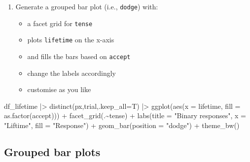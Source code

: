 \documentclass[
  letterpaper,
  DIV=11,
  numbers=noendperiod]{scrartcl}
\newenvironment{Shaded}{\begin{snugshade}}{\end{snugshade}}
\newcommand{\AttributeTok}[1]{\textcolor[rgb]{0.40,0.45,0.13}{#1}}
\newcommand{\FunctionTok}[1]{\textcolor[rgb]{0.28,0.35,0.67}{#1}}
\newcommand{\NormalTok}[1]{\textcolor[rgb]{0.00,0.23,0.31}{#1}}
\newcommand{\SpecialCharTok}[1]{\textcolor[rgb]{0.37,0.37,0.37}{#1}}
\newcommand{\StringTok}[1]{\textcolor[rgb]{0.13,0.47,0.30}{#1}}
\providecommand{\tightlist}{%
  \setlength{\itemsep}{0pt}\setlength{\parskip}{0pt}}\usepackage{longtable,booktabs,array}
\begin{document}
\begin{enumerate}
\def\labelenumi{\arabic{enumi}.}
\tightlist
\item
  Generate a grouped bar plot (i.e., \texttt{dodge}) with:

  \begin{itemize}
  \tightlist
  \item
    a facet grid for \texttt{tense}
  \item
    plots \texttt{lifetime} on the x-axis
  \item
    and fills the bars based on \texttt{accept}
  \item
    change the labels accordingly
  \item
    customise as you like
  \end{itemize}
\end{enumerate}

\begin{Shaded}
\begin{Highlighting}[]
\NormalTok{df\_lifetime }\SpecialCharTok{|\textgreater{}} 
  \FunctionTok{distinct}\NormalTok{(px,trial,}\AttributeTok{.keep\_all=}\NormalTok{T) }\SpecialCharTok{|\textgreater{}} 
  \FunctionTok{ggplot}\NormalTok{(}\FunctionTok{aes}\NormalTok{(}\AttributeTok{x =}\NormalTok{ lifetime, }\AttributeTok{fill =} \FunctionTok{as.factor}\NormalTok{(accept))) }\SpecialCharTok{+}
  \FunctionTok{facet\_grid}\NormalTok{(.}\SpecialCharTok{\textasciitilde{}}\NormalTok{tense) }\SpecialCharTok{+}
  \FunctionTok{labs}\NormalTok{(}\AttributeTok{title =} \StringTok{"Binary responses"}\NormalTok{,}
       \AttributeTok{x =} \StringTok{"Liftime"}\NormalTok{,}
       \AttributeTok{fill =} \StringTok{"Response"}\NormalTok{) }\SpecialCharTok{+}
  \FunctionTok{geom\_bar}\NormalTok{(}\AttributeTok{position =} \StringTok{"dodge"}\NormalTok{) }\SpecialCharTok{+}
  \FunctionTok{theme\_bw}\NormalTok{()}
\end{Highlighting}
\end{Shaded}

\hypertarget{grouped-bar-plots-1}{%
\subsection{Grouped bar plots}\label{grouped-bar-plots-1}}
\end{document}
